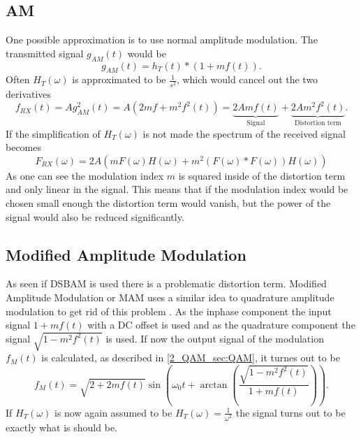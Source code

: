 \subsection{AM}
One possible approximation is to use normal amplitude modulation. The transmitted signal $g_{AM}(t)$ would be 
\begin{equation}
    g_{AM}(t) = h_T(t) * (1 + mf(t)).
\end{equation}
Often $H_T(\omega)$ is approximated to be $\frac{1}{s^2}$, which would cancel out the two derivatives
\begin{equation}
    f_{RX}(t) 
    = 
    Ag^2_{AM}(t) 
    =
    A(2mf + m^2f^2(t))
    =
   \underbrace{2Amf(t)}_{\text{Signal}} + \underbrace{2Am^2f^2(t)}_{\text{Distortion term}}.
\end{equation}
If the simplification of $H_T(\omega)$ is not made the spectrum of the received signal becomes
\begin{equation}
    F_{RX}(\omega) = 2A(mF(\omega)H(\omega) + m^2(F(\omega)*F(\omega))H(\omega))
\end{equation}
As one can see the modulation index $m$ is squared inside of the distortion term and only linear in the signal. This means that if the modulation index would be chosen small enough the distortion term would vanish, but the power of the signal would also be reduced significantly. 
\subsection{Modified Amplitude Modulation}
As seen if DSBAM is used there is a problematic distortion term. Modified Amplitude Modulation or MAM uses a similar idea to quadrature amplitude modulation to get rid of this problem \cite{MAM_Main_Paper} .
As the inphase component the input signal $1 + mf(t)$ with a DC offset is used and  as the quadrature component the signal $\sqrt{1 - m^2f^2(t)}$ is used. If now the output signal of the modulation $f_M(t)$ is calculated, as described in \ref{2_QAM_sec:QAM}, it turnes out to be
\begin{equation}
    f_M(t) = \sqrt{2 + 2mf(t)} \sin{\left(\omega_0 t + \arctan{ \left ( \frac{\sqrt{1 - m^2f^2(t)}}{1 + mf(t)} \right )} \right )}.
\end{equation}
If $H_T(\omega)$ is now again assumed to be $H_T(\omega) = \frac{1}{\omega^2}$ the signal turns out to be exactly what is should be. 

